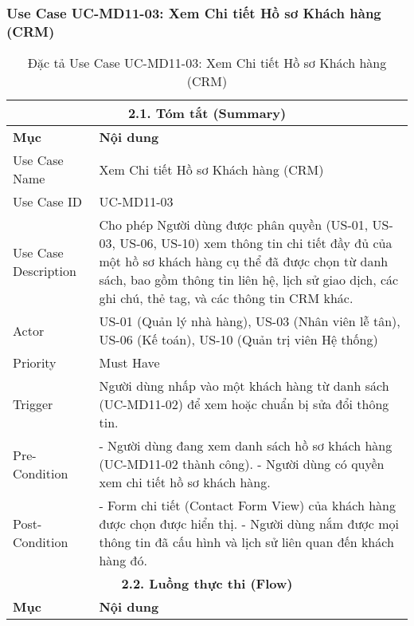 \subsubsection{Use Case UC-MD11-03: Xem Chi tiết Hồ sơ Khách hàng (CRM)}
\begin{longtable}{|m{4cm}|p{11cm}|}
\caption{Đặc tả Use Case UC-MD11-03: Xem Chi tiết Hồ sơ Khách hàng (CRM)} \label{tab:uc_md11_03_view_customer_detail_crm} \\
\hline
\multicolumn{2}{|c|}{\textbf{2.1. Tóm tắt (Summary)}} \\
\hline
\textbf{Mục} & \textbf{Nội dung} \\
\hline
\endhead
\midrule
\endfoot
\bottomrule
\endlastfoot
Use Case Name & Xem Chi tiết Hồ sơ Khách hàng (CRM) \\
\hline
Use Case ID & UC-MD11-03 \\
\hline
Use Case Description & Cho phép Người dùng được phân quyền (US-01, US-03, US-06, US-10) xem thông tin chi tiết đầy đủ của một hồ sơ khách hàng cụ thể đã được chọn từ danh sách, bao gồm thông tin liên hệ, lịch sử giao dịch, các ghi chú, thẻ tag, và các thông tin CRM khác. \\
\hline
Actor & US-01 (Quản lý nhà hàng), US-03 (Nhân viên lễ tân), US-06 (Kế toán), US-10 (Quản trị viên Hệ thống) \\
\hline
Priority & Must Have \\
\hline
Trigger & Người dùng nhấp vào một khách hàng từ danh sách (UC-MD11-02) để xem hoặc chuẩn bị sửa đổi thông tin. \\
\hline
Pre-Condition & - Người dùng đang xem danh sách hồ sơ khách hàng (UC-MD11-02 thành công). \newline - Người dùng có quyền xem chi tiết hồ sơ khách hàng. \\
\hline
Post-Condition & - Form chi tiết (Contact Form View) của khách hàng được chọn được hiển thị. \newline - Người dùng nắm được mọi thông tin đã cấu hình và lịch sử liên quan đến khách hàng đó. \\
\hline
\multicolumn{2}{|c|}{\textbf{2.2. Luồng thực thi (Flow)}} \\
\hline
\textbf{Mục} & \textbf{Nội dung} \\
\hline

\end{longtable}
